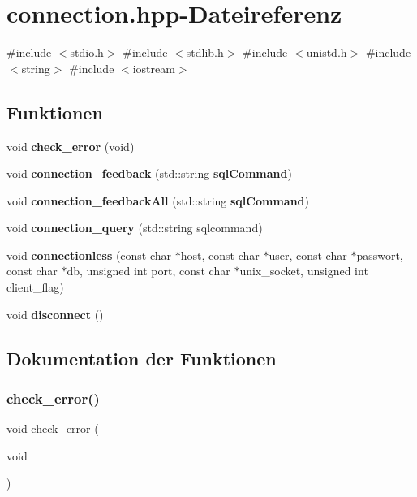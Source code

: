\section{connection.\+hpp-\/\+Dateireferenz}
\label{connection_8hpp}
{\ttfamily \#include $<$stdio.\+h$>$}\newline
{\ttfamily \#include $<$stdlib.\+h$>$}\newline
{\ttfamily \#include $<$unistd.\+h$>$}\newline
{\ttfamily \#include $<$string$>$}\newline
{\ttfamily \#include $<$iostream$>$}\newline
\subsection*{Funktionen}
\begin{DoxyCompactItemize}
\item 
void \textbf{ check\+\_\+error} (void)
\item 
void \textbf{ connection\+\_\+feedback} (std\+::string \textbf{ sql\+Command})
\item 
void \textbf{ connection\+\_\+feedback\+All} (std\+::string \textbf{ sql\+Command})
\item 
void \textbf{ connection\+\_\+query} (std\+::string sqlcommand)
\item 
void \textbf{ connectionless} (const char $\ast$host, const char $\ast$user, const char $\ast$passwort, const char $\ast$db, unsigned int port, const char $\ast$unix\+\_\+socket, unsigned int client\+\_\+flag)
\item 
void \textbf{ disconnect} ()
\end{DoxyCompactItemize}


\subsection{Dokumentation der Funktionen}
\mbox{\label{connection_8hpp_a33fd832a9e1a27bddb7d9837a2dcf2f1}} 
\subsubsection{check\+\_\+error()}
{\footnotesize\ttfamily void check\+\_\+error (\begin{DoxyParamCaption}\item[{void}]{ }\end{DoxyParamCaption})}


